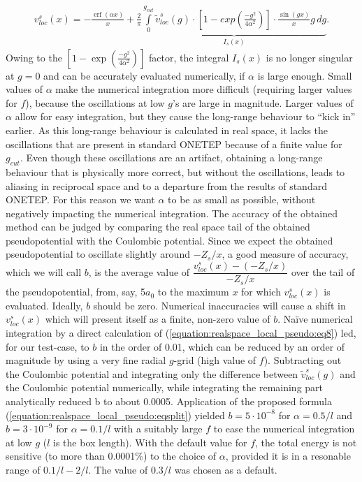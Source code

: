 \documentclass[letterpaper,10pt,english]{sphinxmanual}
\begin{document}
\label{\detokenize{realspace_local_pseudo:equation-eqsplit}}\begin{equation}\label{equation:realspace_local_pseudo:eqsplit}
\begin{split}{v^s_{loc}\left(x\right)}=
-\frac{\operatorname{erf}{\left(\alpha{}x\right)}}{x}+
\frac{2}{\pi}
\underbrace{
\int\limits_0^{g_{cut}}
{\tilde{v}^s_{loc}\left(g\right)}\cdot \left[ 1 - exp\left(\frac{-g^2}{4\alpha^2}\right) \right]
\cdot \frac{\sin\left(gx\right)}{x}g\,dg}_{I_s(x)}
.\end{split}
\end{equation}
Owing to the
\(\left[1-\exp{\left(\frac{-g^2}{4\alpha^2}\right)}\right]\) factor,
the integral \(I_s(x)\) is no longer singular at \(g=0\) and can
be accurately evaluated numerically, if \(\alpha\) is large enough.
Small values of \(\alpha\) make the numerical integration more
difficult (requiring larger values for \(f\)), because the
oscillations at low \(g\)’s are large in magnitude. Larger values
of \(\alpha\) allow for easy integration, but they cause the
long-range behaviour to “kick in” earlier. As this long-range behaviour
is calculated in real space, it lacks the oscillations that are present
in standard ONETEP because of a finite value for \(g_{cut}\). Even
though these oscillations are an artifact, obtaining a long-range
behaviour that is physically more correct, but without the oscillations,
leads to aliasing in reciprocal space and to a departure from the
results of standard ONETEP. For this reason we want \(\alpha\) to be
as small as possible, without negatively impacting the numerical
integration. The accuracy of the obtained method can be judged by
comparing the real space tail of the obtained pseudopotential with the
Coulombic potential. Since we expect the obtained pseudopotential to
oscillate slightly around \(-Z_s/x\), a good measure of accuracy,
which we will call \(b\), is the average value of
\(\dfrac{{v^s_{loc}\left(x\right)}-(-Z_s/x)}{-Z_s/x}\) over the tail
of the pseudopotential, from, say, 5\(a_0\) to the maximum
\(x\) for which \({v^s_{loc}\left(x\right)}\) is evaluated.
Ideally, \(b\) should be zero. Numerical inaccuracies will cause a
shift in \({v^s_{loc}\left(x\right)}\) which will present itself as
a finite, non-zero value of \(b\). Naïve numerical integration by a
direct calculation of (\eqref{equation:realspace_local_pseudo:eq8}) led, for our test-case, to \(b\) in
the order of 0.01, which can be reduced by an order of magnitude by
using a very fine radial \(g\)-grid (high value of \(f\)).
Subtracting out the Coulombic potential and integrating only the
difference between \({\tilde{v}^s_{loc}\left(g\right)}\) and the
Coulombic potential numerically, while integrating the remaining part
analytically reduced b to about 0.0005. Application of the proposed
formula (\eqref{equation:realspace_local_pseudo:eqsplit}) yielded \(b=5\cdot10^{-8}\) for
\(\alpha=0.5/l\) and \(b=3\cdot10^{-9}\) for
\(\alpha=0.1/l\) with a suitably large \(f\) to ease the
numerical integration at low \(g\) (\(l\) is the box length).
With the default value for \(f\), the total energy is not sensitive
(to more than 0.0001\%) to the choice of \(\alpha\), provided it is
in a resonable range of \(0.1/l - 2/l\). The value of \(0.3/l\)
was chosen as a default.
\end{document}
